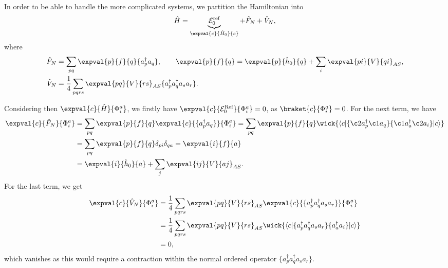 In order to be able to handle the more complicated systems, we partition the Hamiltonian into
\begin{equation}
    \hat{H} = \underbrace{\mathcal{E}_0^{\text{ref}}}_{\expval{c}{\hat{H}_0}{c}} + \hat{F}_N + \hat{V}_N,
\end{equation}
where
\begin{align*}
    \hat{F}_N &= \sum_{pq} \expval{p}{f}{q} \{a_p^\dagger a_q\}, \qquad
    \expval{p}{f}{q} = \expval{p}{\hat{h}_0}{q} + \sum_{i} \expval{pi}{V}{qi}_{AS}, \\
    \hat{V}_N &= \frac{1}{4} \sum_{pqrs} \expval{pq}{V}{rs}_{AS} \{a_p^\dagger a_q^\dagger a_s a_r\}.
\end{align*}

Considering then $\expval{c}{\hat{H}}{\Phi_i^a}$, we firstly have $\expval{c}{\mathcal{E}_0^{\text{Ref}}}{\Phi_i^a} = 0$, as $\braket{c}{\Phi_i^a} = 0$.
For the next term, we have
\begin{align*}
    \expval{c}{\hat{F}_N}{\Phi_i^a} &= \sum_{pq} \expval{p}{f}{q} \expval{c}{\{ a_p^\dagger a_q \}}{\Phi_i^a}
    = \sum_{pq} \expval{p}{f}{q} \wick{
        \langle c \vert
        \{ \c2 a_p^\dagger \c1 a_q \}
        \{ \c1 a_a^\dagger \c2 a_i \}
        \vert c \rangle
    } \\
    &= \sum_{pq} \expval{p}{f}{q} \delta_{pi} \delta_{qa}
    = \expval{i}{f}{a} \\
    &= \expval{i}{\hat{h}_0}{a} + \sum_{j} \expval{ij}{V}{aj}_{AS}.
\end{align*}
For the last term, we get
\begin{align*}
    \expval{c}{\hat{V}_N}{\Phi_i^a} &= \frac{1}{4} \sum_{pqrs} \expval{pq}{V}{rs}_{AS} \expval{c}{\{a_p^\dagger a_q^\dagger a_s a_r \}}{\Phi_i^a} \\
    &= \frac{1}{4} \sum_{pqrs} \expval{pq}{V}{rs}_{AS} \wick{
        \langle c \vert
        \{ a_p^\dagger a_q^\dagger a_s a_r \}
        \{ a_a^\dagger a_i \}
        \vert c \rangle
    } \\
    &= 0,
\end{align*}
which vanishes as this would require a contraction within the normal ordered operator $\{a_p^\dagger a_q^\dagger a_s a_r\}$.

